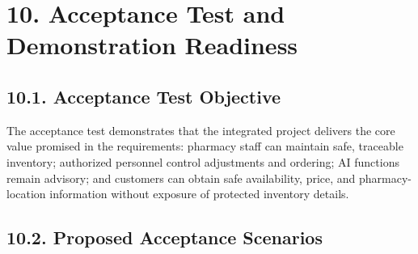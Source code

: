 \clearpage
\section{10. Acceptance Test and Demonstration Readiness}\label{acceptance-test-and-demonstration-readiness}

\subsection{10.1. Acceptance Test Objective}\label{acceptance-test-objective}

The acceptance test demonstrates that the integrated project delivers the core value promised in the requirements: pharmacy staff can maintain safe, traceable inventory; authorized personnel control adjustments and ordering; AI functions remain advisory; and customers can obtain safe availability, price, and pharmacy-location information without exposure of protected inventory details.

\subsection{10.2. Proposed Acceptance Scenarios}\label{proposed-acceptance-scenarios}


